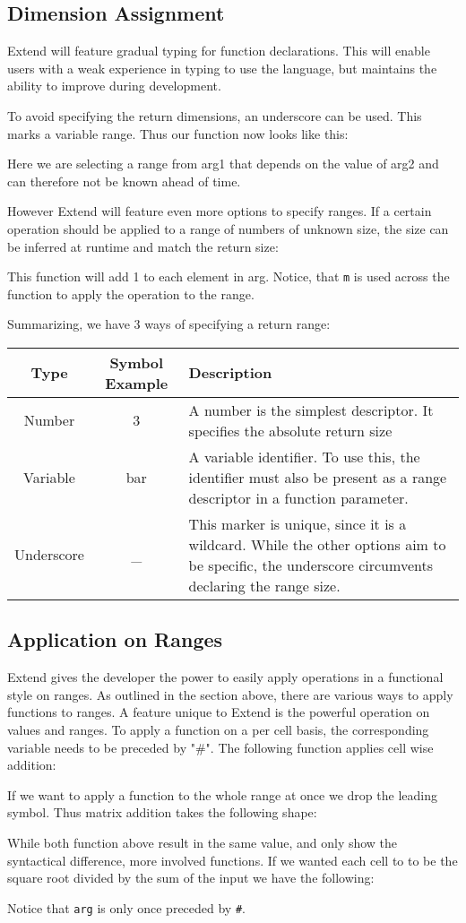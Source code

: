\subsection{Dimension Assignment}
\par Extend will feature gradual typing for function declarations. This will enable users with a weak experience in typing to use the language, but maintains the ability to improve during development.
\par To avoid specifying the return dimensions, an underscore can be used. This marks a variable range. Thus our function now looks like this:

Here we are selecting a range from arg1 that depends on the value of arg2 and can therefore not be known ahead of time.
\par However Extend will feature even more options to specify ranges. If a certain operation should be applied to a range of numbers of unknown size, the size can be inferred at runtime and match the return size:

This function will add 1 to each element in arg. Notice, that \texttt{m} is used across the function to apply the operation to the range.
\par Summarizing, we have 3 ways of specifying a return range:\newline
\begin{tabularx}{\columnwidth}{| c | c | X |} \hline
Type & Symbol Example & Description \\ \hline
Number & 3 & A number is the simplest descriptor. It specifies the absolute return size \\ \hline
Variable & bar & A variable identifier. To use this, the identifier must also be present as a range descriptor in a function parameter. \\ \hline
Underscore & \_ & This marker is unique, since it is a wildcard. While the other options aim to be specific, the underscore circumvents declaring the range size. \\ \hline
\end{tabularx}
\subsection{Application on Ranges}
Extend gives the developer the power to easily apply operations in a functional style on ranges. As outlined in the section above, there are various ways to apply functions to ranges. A feature unique to Extend is the powerful operation on values and ranges. To apply a function on a per cell basis, the corresponding variable needs to be preceded by "\#". The following function applies cell wise addition:

If we want to apply a function to the whole range at once we drop the leading symbol. Thus matrix addition takes the following shape:

While both function above result in the same value, and only show the syntactical difference, more involved functions. If we wanted each cell to to be the square root divided by the sum of the input we have the following:

Notice that \texttt{arg} is only once preceded by \texttt{\#}.
